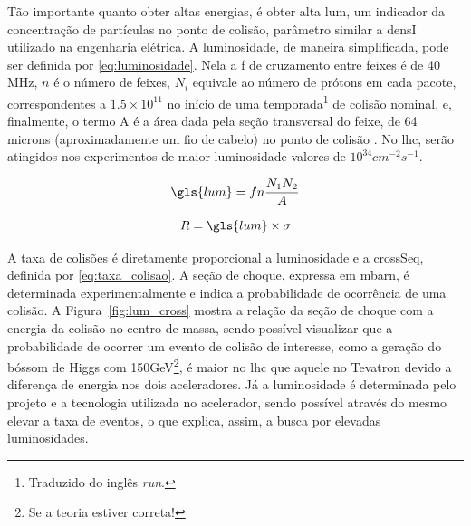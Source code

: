 \label{sssec:Lum_Crosseq}
Tão importante quanto obter altas energias, é obter alta
\gls{lum}, um indicador da concentração 
de partículas no ponto de colisão, parâmetro similar a \gls{densI} 
utilizado na engenharia elétrica. A luminosidade, de maneira
simplificada, pode ser definida por
\ref{eq:luminosidade}. Nela a \gls{f} de cruzamento entre feixes
é de 40 MHz, $n$ é o número de feixes, 
$N_i$ equivale ao número de prótons em
cada pacote, correspondentes a $1.5\times10^{11}$ no início de uma
temporada\footnote{Traduzido do inglês \emph{run}.} de colisão nominal, e,
finalmente, o termo A é a área dada pela seção transversal do feixe, 
de 64 microns (aproximadamente um fio de cabelo) no ponto de colisão
\cite{webLHC}. No \gls{lhc}, serão atingidos nos experimentos de maior luminosidade 
valores de $10^{34}cm^{-2}s^{-1}$.


\begin{equation} \label{eq:luminosidade}
\gls{lum}=fn\frac{N_1 N_2}{A}
\end{equation}

\begin{equation}
R = \gls{lum} \times \sigma
\label{eq:taxa_colisao}
\end{equation}

A taxa de colisões é diretamente proporcional a luminosidade e a \gls{crossSeq}, 
definida por \ref{eq:taxa_colisao}. A seção de choque, expressa em mbarn, 
é determinada experimentalmente e indica a probabilidade de ocorrência de uma colisão. 
A Figura~\ref{fig:lum_cross} mostra a relação da seção de choque com a energia
da colisão no centro de massa, sendo possível visualizar que a probabilidade 
de ocorrer um evento de colisão de interesse, como a geração do
bóssom de Higgs com 150GeV\footnote{Se a teoria estiver correta!}, é maior no \gls{lhc} 
que aquele no Tevatron devido a diferença de energia nos dois aceleradores.
Já a luminosidade é determinada pelo projeto e a tecnologia utilizada no 
acelerador, sendo possível através do mesmo elevar a taxa de eventos, o que
explica, assim, a busca por elevadas luminosidades.

